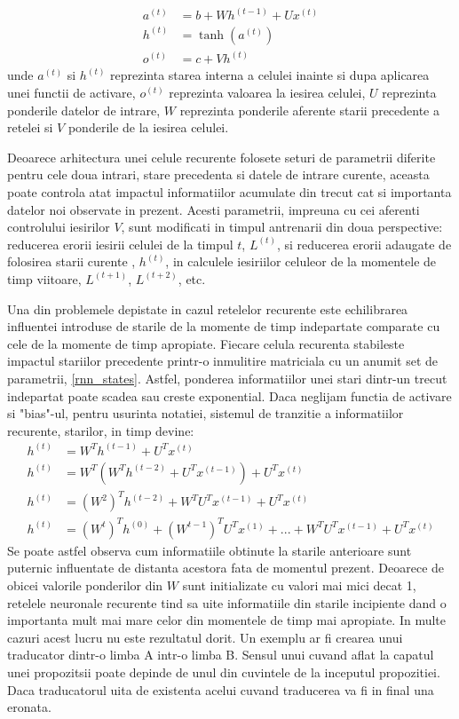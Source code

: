 \documentclass[a4paper,12pt]{book}
\begin{document}
				\begin{align}
					a^{(t)} &= b + Wh^{(t-1)} + Ux^{(t)} \\ \label{rnn_states}
					h^{(t)} &= \tanh{(a^{(t)})}\\
					o^{(t)} &= c + Vh^{(t)}	
				\end{align}
				unde $a^{(t)}$ si $h^{(t)}$ reprezinta starea interna a celulei inainte si dupa aplicarea unei functii de activare, $o^{(t)}$ reprezinta valoarea la iesirea celulei, $U$ reprezinta ponderile datelor de intrare, $W$ reprezinta ponderile aferente starii precedente a retelei si $V$ ponderile de la iesirea celulei. \par
				
				Deoarece arhitectura unei celule recurente folosete seturi de parametrii diferite pentru cele doua intrari, stare precedenta si datele de intrare curente, aceasta poate controla atat impactul informatiilor acumulate din trecut cat si importanta datelor noi observate in prezent. Acesti parametrii, impreuna cu cei aferenti controlului iesirilor $V$,  sunt modificati in timpul antrenarii din doua perspective: reducerea erorii iesirii celulei de la timpul $t$, $L^{(t)}$,  si reducerea erorii adaugate de folosirea starii curente , $h^{(t)}$, in calculele iesiriilor celuleor de la momentele de timp viitoare, $L^{(t+1)}$, $L^{(t+2)}$, etc. \par
				
				Una din problemele depistate in cazul retelelor recurente este echilibrarea influentei introduse de starile de la momente de timp indepartate comparate cu cele de la momente de timp apropiate. Fiecare celula recurenta stabileste impactul stariilor precedente printr-o inmulitire matriciala cu un anumit set de parametrii, \ref{rnn_states}. Astfel, ponderea informatiilor unei stari dintr-un trecut indepartat poate scadea sau creste exponential. Daca neglijam functia de activare si "bias"-ul, pentru usurinta notatiei, sistemul de tranzitie a informatiilor recurente, starilor, in timp devine:
				\begin{align*}
				h^{(t)} &=  W^Th^{(t-1)} + U^Tx^{(t)}\\				
				h^{(t)} &=  W^T(W^Th^{(t-2)} + U^Tx^{(t-1)}) + U^Tx^{(t)}\\	
				h^{(t)} &= (W^2)^Th^{(t-2)} + W^TU^Tx^{(t-1)} + U^Tx^{(t)}\\	
				h^{(t)} &= (W^t)^Th^{(0)} + (W^{t-1})^TU^Tx^{(1)}+ ...+ W^TU^Tx^{(t-1)} + U^Tx^{(t)}
				\end{align*}
				Se poate astfel observa cum informatiile obtinute la starile anterioare sunt puternic influentate de distanta acestora fata de
				momentul prezent. Deoarece de obicei valorile ponderilor din $W$ sunt initializate cu valori mai mici decat 1, retelele neuronale recurente tind sa uite informatiile din starile incipiente dand o importanta mult mai mare celor din momentele de timp mai apropiate. In multe cazuri acest lucru nu este rezultatul dorit. Un exemplu ar fi crearea unui traducator dintr-o limba A intr-o limba B. Sensul unui cuvand aflat la capatul unei propozitsii poate depinde de unul din cuvintele de la inceputul propozitiei. Daca traducatorul uita de existenta acelui cuvand traducerea va fi in final una eronata.\par
				
\end{document}
